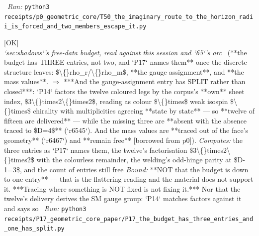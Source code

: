 \begin{description}
\ \emph{Run:} \texttt{python3 receipts/p0\_geometric\_core/T50\_the\_imaginary\_route\_to\_the\_horizon\_radii\_is\_forced\_and\_two\_members\_escape\_it.py}
\item[\rcptlabel{P17_the_budget_has_three_entries_and_one_has_split}{P17R19}\textbf{P17R19}\quad\texttt{P17\_the\_budget\_has\_three\_entries\_and\_one\_has\_split}]\hfill\textsf{[OK]}\\
\textit{`sec:shadows`'s free-data budget, read against this session and `65`'s arc} \ (**the budget has THREE entries, not two, and `P17` names them** once the discrete structure leaves: \$\textbackslash\{\}rho\_r/\textbackslash\{\}rho\_m\$, **the gauge assignment**, and **the mass values**. \ensuremath{\Rightarrow} ***And the gauge-assignment entry has SPLIT rather than closed***: `P14` factors the twelve coloured legs by the corpus's **own** sheet index, \$3\textbackslash\{\}times2\textbackslash\{\}times2\$, reading as colour \$\textbackslash\{\}times\$ weak isospin \$\textbackslash\{\}times\$ chirality with multiplicities agreeing **state by state** --- so **twelve of fifteen are delivered** --- while the missing three are **absent with the absence traced to \$D=4\$** (`r6545`). And the mass values are **traced out of the face's geometry** (`r6467`) and **remain free** [borrowed from p0]). 
\emph{Computes:} the three entries as `P17` names them, the twelve's factorisation \$3\textbackslash\{\}times2\textbackslash\{\}times2\$ with the colourless remainder, the welding's odd-hinge parity at \$D-1=3\$, and the count of entries still free
 \emph{Bound:}  **NOT that the budget is down to one entry** --- that is the flattering reading and the material does not support it. ***Tracing where something is NOT fixed is not fixing it.*** Nor that the twelve's delivery derives the SM gauge group: `P14` matches factors against it and says so
\ \emph{Run:} \texttt{python3 receipts/P17\_geometric\_core\_paper/P17\_the\_budget\_has\_three\_entries\_and\_one\_has\_split.py}
\end{description}\endgroup
